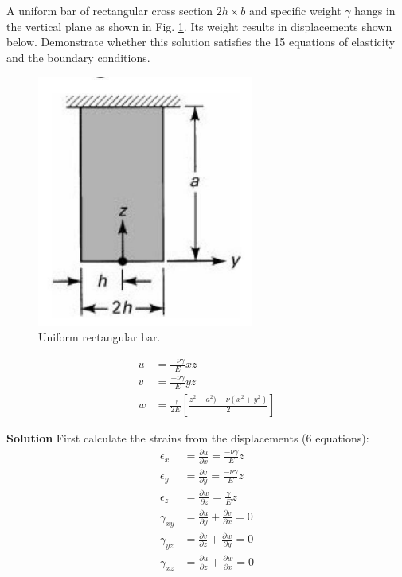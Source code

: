 \section{}
A uniform bar of rectangular cross section $2h \times b$ and specific weight $\gamma$ hangs in the vertical plane
as shown in Fig. \ref{fig:Q5}. Its weight results in displacements shown below. Demonstrate whether
this solution satisfies the 15 equations of elasticity and the boundary conditions.

\begin{figure}[h]
    \centering
    \includegraphics[width=0.5\linewidth]{Questions/Figures/Q5ProblemDiagram.png}
    \caption{Uniform rectangular bar.}
    \label{fig:Q5}
\end{figure}

\begin{align*}
    u &= \frac{-\nu\gamma}{E} xz \\
    v &= \frac{-\nu\gamma}{E} yz \\
    w &= \frac{\gamma}{2E} \left[\frac{z^2 - a^2) + \nu(x^2 + y^2)}{2}\right]
\end{align*}

\textbf{Solution}
First calculate the strains from the displacements (6 equations):
\[
\begin{aligned}
    \epsilon_x &= \frac{\partial u}{\partial x} = \frac{-\nu\gamma}{E} z \\
    \epsilon_y &= \frac{\partial v}{\partial y} = \frac{-\nu\gamma}{E} z \\
    \epsilon_z &= \frac{\partial w}{\partial z} = \frac{\gamma}{E} z \\
    \gamma_{xy} &= \frac{\partial u}{\partial y} + \frac{\partial v}{\partial x} = 0 \\
    \gamma_{yz} &= \frac{\partial v}{\partial z} + \frac{\partial w}{\partial y} = 0 \\
    \gamma_{xz} &= \frac{\partial u}{\partial z} + \frac{\partial w}{\partial x} = 0 \\\
\end{aligned}
\]

